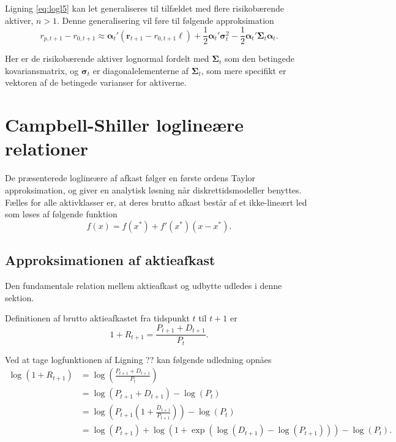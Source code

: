 \documentclass[
  a4paper,
  oneside]{memoir}
\begin{document}
Ligning \eqref{eq:logl5} kan let generaliseres til tilfældet med flere risikobærende aktiver, \(n>1\). Denne generalisering vil føre til følgende approksimation
\begin{equation}
r_{p,t+1} - r_{0,t+1} \approx \bm{\alpha}_t'(\bm{r}_{t+1} - r_{0,t+1}\bm{\ell}) + \frac{1}{2} \bm{\alpha}_t'\bm{\sigma}_t^2 - \frac{1}{2}\bm{\alpha}_t'\bm{\Sigma}_t\bm{\alpha}_t. \label{eq:logl6}
\end{equation}

Her er de risikobærende aktiver lognormal fordelt med \(\bm{\Sigma}_t\) som den betingede kovariansmatrix, og \(\bm{\sigma}_t\) er diagonalelementerne af \(\bm{\Sigma}_t\), som mere specifikt er vektoren af de betingede varianser for aktiverne.

\hypertarget{campbell-shiller-loglineuxe6re-relationer}{%
\chapter{Campbell-Shiller loglineære relationer}\label{campbell-shiller-loglineuxe6re-relationer}}

De præsenterede loglineære af afkast følger en første ordens Taylor approksimation, og giver en analytisk løsning når diskrettidsmodeller benyttes. Fælles for alle aktivklasser er, at deres brutto afkast består af et ikke-lineært led som løses af følgende funktion
\[f(x)=f(x^*)+f'(x^*)(x-x^*).\]

\hypertarget{approksimationen-af-aktieafkast}{%
\section{Approksimationen af aktieafkast}\label{approksimationen-af-aktieafkast}}

Den fundamentale relation mellem aktieafkast og udbytte udledes i denne sektion.

Definitionen af brutto aktieafkastet fra tidspunkt \(t\) til \(t+1\) er
\begin{equation}
1+R_{t+1}=\frac{P_{t+1}+D_{t+1}}{P_t}.
\end{equation}

Ved at tage logfunktionen af Ligning ?? kan følgende udledning opnåes
\begin{align}
\log(1+R_{t+1})&=\log(\frac{P_{t+1}+D_{t+1}}{P_t})\\
&=\log(P_{t+1}+D_{t+1})-\log(P_t)\\
&=\log(P_{t+1}(1+\frac{D_{t+1}}{P_{t+1}}))-\log(P_t)\\
&=\log(P_{t+1})+\log(1+\exp(\log(D_{t+1})-\log(P_{t+1})))-\log(P_t).
\end{align}
\end{document}
